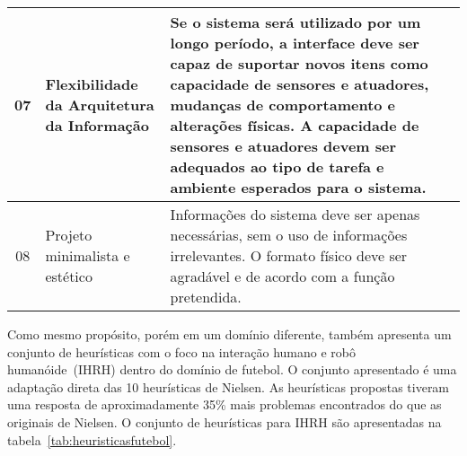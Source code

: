 \begin{table}[!ht]
\begin{tabular}{ c | m{4cm} | m{10cm} }
		\hline
        07 & Flexibilidade da Arquitetura da Informação & Se o sistema será utilizado por um longo período, a interface deve ser capaz de suportar novos itens como capacidade de sensores e atuadores, mudanças de comportamento e alterações físicas. A capacidade de sensores e atuadores devem ser adequados ao tipo de tarefa e ambiente esperados para o sistema. \\
		\hline
        08 & Projeto minimalista e estético & Informações do sistema deve ser apenas necessárias, sem o uso de informações irrelevantes. O formato físico deve ser agradável e de acordo com a função pretendida. \\
		\hline
	\end{tabular}
\end{table}

Como mesmo propósito, porém em um domínio diferente, \textcite{elara:2007} também apresenta um conjunto de heurísticas com o foco na interação humano e robô humanóide~(IHRH) dentro do domínio de futebol. O conjunto apresentado é uma adaptação direta das 10 heurísticas de Nielsen. As heurísticas propostas tiveram uma resposta de aproximadamente 35\% mais problemas encontrados do que as originais de Nielsen. O conjunto de heurísticas para IHRH são apresentadas na tabela~\ref{tab:heuristicasfutebol}.

